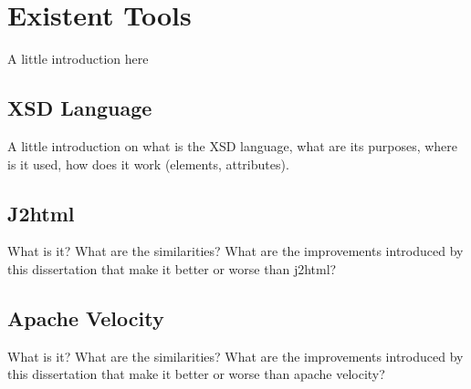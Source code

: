 \chapter{Existent Tools}
\label{cha:tools}

A little introduction here

\section{XSD Language} %
\label{sec:xsd}

A little introduction on what is the XSD language, what are its purposes, where is it used, how does it work (elements, attributes).

\section{J2html} %
\label{sec:j2html}

What is it? What are the similarities? What are the improvements introduced by this dissertation that make it better or worse than j2html?

\section{Apache Velocity} %
\label{sec:apachevelocity}

What is it? What are the similarities? What are the improvements introduced by this dissertation that make it better or worse than apache velocity?
